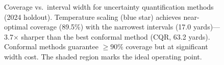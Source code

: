 \begin{figure}[htbp]
\caption[Conformal prediction method comparison]{Coverage vs.\ interval width for uncertainty quantification methods (2024 holdout). Temperature scaling (blue star) achieves near-optimal coverage (89.5\%) with the narrowest intervals (17.0 yards)---3.7$\times$ sharper than the best conformal method (CQR, 63.2 yards). Conformal methods guarantee $\geq 90\%$ coverage but at significant width cost. The shaded region marks the ideal operating point.}
\label{fig:conformal-comparison-chart}
\end{figure}
